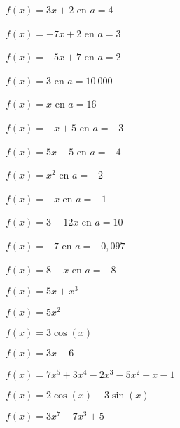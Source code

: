 \documentclass[11pt]{article}
\begin{document}
\begin{exercice}
  \begin{multicols}{3}
    \begin{enu}
    \item $f(x) = 3x + 2$ en $a=4$
    \item $f(x) = -7x + 2$ en $a=3$
    \item $f(x) = -5x + 7$ en $a=2$
    \item $f(x) = 3$ en $a=10~000$
    \item $f(x) = x$ en $a=16$
    \item $f(x) = - x + 5$ en $a=-3$
    \item $f(x) = 5x - 5$ en $a= -4$
    \item $f(x) = x^2$ en $a=-2$
    \item $f(x) = - x$ en $a=-1$
    \item $f(x) = 3 - 12x$ en $a=10$
    \item $f(x) = -7$ en $a=-0,097$
    \item $f(x) = 8 + x$ en $a=-8$
    \end{enu}
  \end{multicols}
\end{exercice}

\newpage

\begin{exercice}[1][Calculer $f'(x)$]
  \begin{multicols}{3}
    \begin{enu}
    \item $f(x) = 5x + x^3$
    \item $f(x) = 5x^2$
    \item $f(x) = 3 \cos(x)$
    \item $f(x) = 3x-6$
    \item $f(x) = 7x^5 + 3x^4-2x^3-5x^2 + x-1$
    \item $f(x) = 2 \cos(x)-3 \sin(x)$
    \item $f(x) = 3x^7-7x^3 + 5$
    \end{enu}
  \end{multicols}
\end{exercice}
\end{document}
